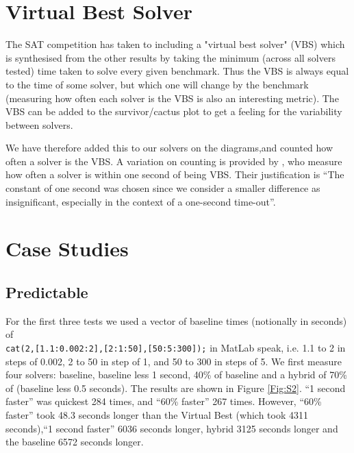 \documentclass{article}
\begin{document}
\section{Virtual Best Solver}
The SAT competition has taken to including a "virtual best solver" (VBS)
which is synthesised from the other results by taking the minimum (across all solvers tested) time taken to solve every given benchmark.
Thus the VBS is always equal to the time of some solver, but which one will change by the benchmark (measuring how often each solver is the VBS is also an interesting metric).  The VBS can be added to the survivor/cactus plot to get a feeling for the variability between solvers.
\par
We have therefore added this to our solvers on the diagrams,and counted how often a solver is the VBS. A variation on counting is provided by \cite{Janotaetal2016a}, who measure how often a solver is within one second of being VBS. Their justification is ``The constant of one second was chosen since we consider a smaller difference as insignificant, especially in the context of a one-second time-out''.
\section{Case Studies}
\subsection{Predictable}\label{sec:Pr}
For the first three tests we used a vector of baseline times (notionally in seconds) of \\\verb+cat(2,[1.1:0.002:2],[2:1:50],[50:5:300]);+ in MatLab speak, i.e. 1.1 to 2 in steps of 0.002, 2 to 50 in step of 1, and 50 to 300 in steps of 5. We first measure four solvers: baseline, baseline less 1 second, 40\% of baseline and a hybrid of 70\% of (baseline less 0.5 seconds). The results are shown in Figure \ref{Fig:S2}. ``1 second faster'' was quickest 284 times, and ``60\% faster'' 267 times. However, ``60\% faster'' took 48.3 seconds longer than the Virtual Best (which took 4311 seconds),``1 second faster'' 6036 seconds longer, hybrid  3125 seconds longer and the baseline 6572 seconds longer.
\end{document}
